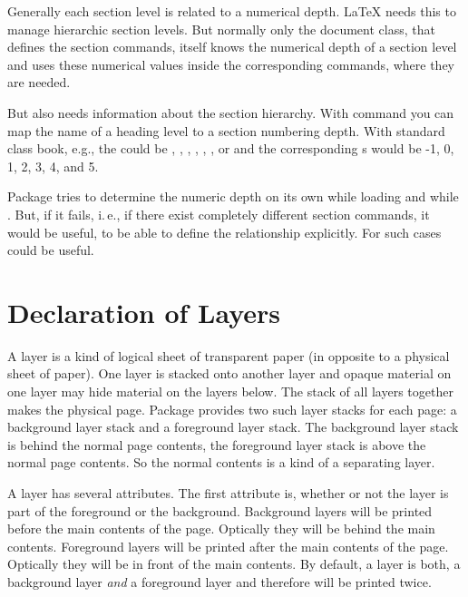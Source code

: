 \begin{Declaration}
\end{Declaration}
%
Generally each section level is related to a numerical depth. \LaTeX{} needs
this to manage hierarchic section levels. But normally only the document
class, that defines the section commands, itself knows the numerical depth of
a section level and uses these numerical values inside the corresponding
commands, where they are needed.

But  also needs information about the section hierarchy.
With command  you can map
the name of a heading level to a section numbering depth. With standard class
book, e.g., the  could be , ,
, , ,
, or  and the corresponding
s would be -1, 0, 1, 2, 3, 4, and 5. 

Package  tries to determine the numeric depth on its own
while loading and while . But, if it fails,
i.\,e., if there exist completely different section commands, it would be
useful, to be able to define the relationship explicitly. For such cases
 could be useful.%

\section{Declaration of Layers}
\label{sec:scrlayer.layers}

A layer is a kind of logical sheet of transparent paper (in opposite to a
physical sheet of paper). One layer is stacked onto another layer and opaque
material on one layer may hide material on the layers below. The stack of all
layers together makes the physical page. Package 
provides two such layer stacks for each page: a background layer stack and a
foreground layer stack. The background layer stack is behind the normal page
contents, the foreground layer stack is above the normal page contents. So the
normal contents is a kind of a separating layer.

A layer has several attributes. The first attribute is, whether or not
the layer is part of the foreground or the background. Background
layers will be printed before the main contents of the page. Optically
they will be behind the main contents. Foreground layers will be
printed after the main contents of the page. Optically they will be in
front of the main contents. By default, a layer is both, a background
layer \emph{and} a foreground layer and therefore will be printed
twice.

